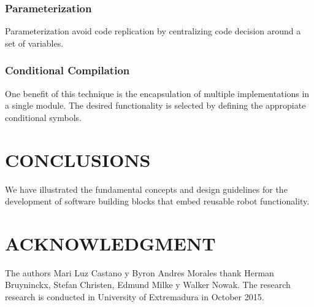 \documentclass[letterpaper, 10 pt, conference]{ieeeconf}
\begin{document}
\subsubsection{Parameterization}
Parameterization avoid code replication by centralizing code decision around a set of variables.

\subsubsection{Conditional Compilation}
One benefit of this technique is the encapsulation of multiple implementations in a single module. The desired functionality is selected by defining the appropiate conditional symbols.

\section*{CONCLUSIONS}
We have illustrated the fundamental concepts and design guidelines for the development of software building blocks that embed reusable robot functionality. 

\section*{ACKNOWLEDGMENT}
The authors Mari Luz Castano y Byron Andres Morales thank Herman Bruyninckx, Stefan Christen, Edmund Milke y Walker Nowak. The research research is conducted in University of Extremadura in October 2015. 
\end{document}
